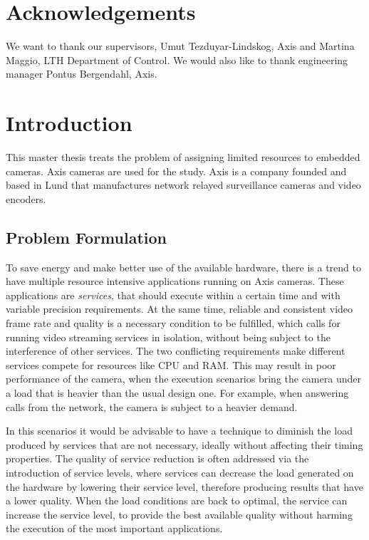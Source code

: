 \documentclass[nobiblatex]{LTHthesis}
\begin{document}
\chapter*{Acknowledgements}

We want to thank our supervisors, Umut Tezduyar-Lindskog, Axis and Martina 
Maggio, LTH Department of Control. We would also like to thank engineering 
manager Pontus Bergendahl, Axis.

\newpage

\tableofcontents
\newpage

\setcounter{page}{1}

\chapter{Introduction}

This master thesis treats the problem of assigning limited resources to
embedded cameras. Axis cameras are used for the study. Axis is a company
founded and based in Lund that manufactures network relayed surveillance
cameras and video encoders.

\section{Problem Formulation}

To save energy and make better use of the available hardware, there is a
trend to have multiple resource intensive applications running on Axis
cameras. These applications are \emph{services}, that should execute within
a certain time and with variable precision requirements. At the same time,
reliable and consistent video frame rate and quality is a necessary
condition to be fulfilled, which calls for running video streaming
services in isolation, without being subject to the interference of
other services. The two conflicting requirements make different services 
compete for resources like CPU and RAM. This may result in poor performance 
of the camera, when the execution scenarios bring the camera under a load
that is heavier than the usual design one. For example, when answering calls
from the network, the camera is subject to a heavier demand. 

In this scenarios it would be advisable to have a technique to diminish
the load produced by services that are not necessary, ideally without
affecting their timing properties. The quality of service reduction is
often addressed via the introduction of service levels, where services can
decrease the load generated on the hardware by lowering their service level,
therefore producing results that have a lower quality. When the load
conditions are back to optimal, the service can increase the service level,
to provide the best available quality without harming the execution of the
most important applications.
\end{document}
